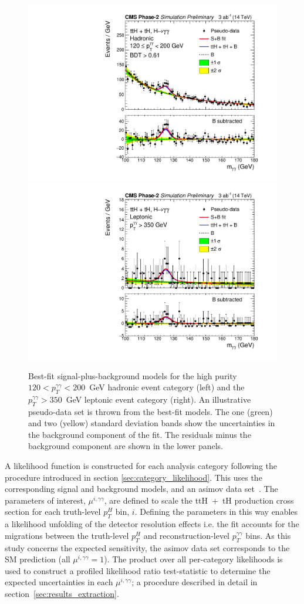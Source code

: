 \begin{figure}[htb!]
  \centering
  \includegraphics[width=.49\textwidth]{Figures/cms/trilinear/CMS-PAS-FTR-18-020_Figure_004-a.pdf}
  \includegraphics[width=.49\textwidth]{Figures/cms/trilinear/CMS-PAS-FTR-18-020_Figure_005-f.pdf}
  \caption[Diphoton mass distributions for two event categories in the HL-LHC sensitivity study]
  {
     Best-fit signal-plus-background models for the high purity $120<p_T^{\gamma\gamma}<200$~GeV hadronic event category (left) and the $p_T^{\gamma\gamma}>350$~GeV leptonic event category (right). An illustrative pseudo-data set is thrown from the best-fit models. The one (green) and two (yellow) standard deviation bands show the uncertainties in the background component of the fit. The residuals minus the background component are shown in the lower panels.
  }
  \label{fig:trilinear_mgg}
\end{figure}

A likelihood function is constructed for each analysis category following the procedure introduced in section \ref{sec:category_likelihood}. This uses the corresponding signal and background models, and an asimov data set~\cite{Cowan:2010js}. The parameters of interest, $\mu^{i,\gamma\gamma}$, are defined to scale the ttH~+~tH production cross section for each truth-level $p_T^H$ bin, $i$. Defining the parameters in this way enables a likelihood unfolding of the detector resolution effects i.e. the fit accounts for the migrations between the truth-level $p_T^H$ and reconstruction-level $p_T^{\gamma\gamma}$ bins. As this study concerns the expected sensitivity, the asimov data set corresponds to the SM prediction (all $\mu^{i,\gamma\gamma}=1$). The product over all per-category likelihoods is used to construct a profiled likelihood ratio test-statistic to determine the expected uncertainties in each $\mu^{i,\gamma\gamma}$; a procedure described in detail in section~\ref{sec:results_extraction}.

